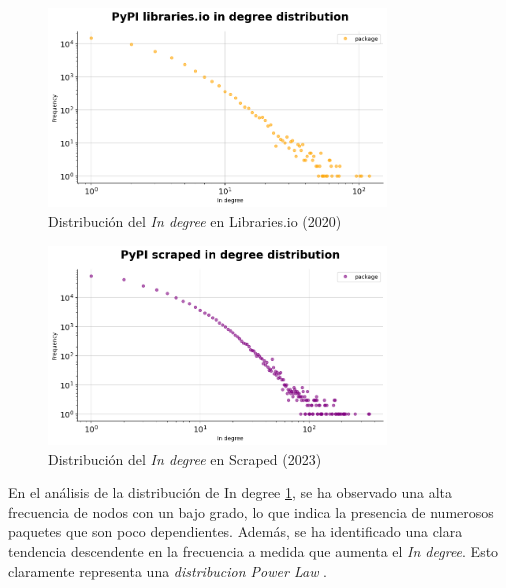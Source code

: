 \begin{figure}[ht!]
    \begin{center}
        \includegraphics[width=0.8\textwidth]{img/pypi/ind_libio_d.png}
        \caption{Distribución del \textit{In degree} en Libraries.io (2020)}
        \label{fig: Distribución del In degree en Libraries.io}
    \end{center}
\end{figure}

\begin{figure}[ht!]
    \begin{center}
        \includegraphics[width=0.8\textwidth]{img/pypi/ind_scraped_dist.png}
        \caption{Distribución del \textit{In degree} en Scraped (2023)}
        \label{fig: Distribución del In degree en Scraped}
    \end{center}
\end{figure}

En el análisis de la distribución de In degree \ref{fig: Distribución del In degree en Libraries.io},
se ha observado una alta frecuencia de nodos con un bajo grado,
lo que indica la presencia de numerosos paquetes que son poco dependientes. Además, se ha identificado
una clara tendencia descendente en la frecuencia a medida que aumenta el \textit{In degree}.
Esto claramente representa una \textit{distribucion Power Law} \cite{enwiki:1160892030}.

